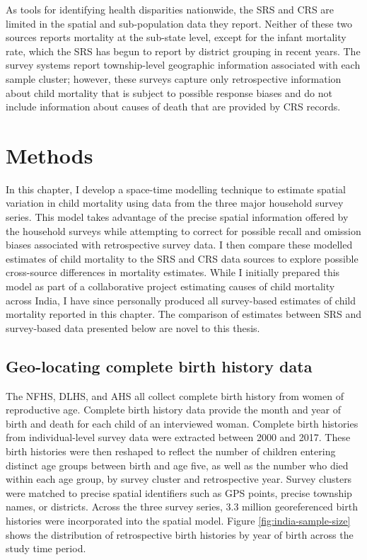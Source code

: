 \documentclass[
]{report}
\begin{document}
As tools for identifying health disparities nationwide, the SRS and CRS are limited in the spatial and sub-population data they report. Neither of these two sources reports mortality at the sub-state level, except for the infant mortality rate, which the SRS has begun to report by district grouping in recent years.\autocite{Mahapatra2010} The survey systems report township-level geographic information associated with each sample cluster; however, these surveys capture only retrospective information about child mortality that is subject to possible response biases and do not include information about causes of death that are provided by CRS records.\autocite{Dandona2016}

\hypertarget{methods-2}{%
\section{Methods}\label{methods-2}}

In this chapter, I develop a space-time modelling technique to estimate spatial variation in child mortality using data from the three major household survey series. This model takes advantage of the precise spatial information offered by the household surveys while attempting to correct for possible recall and omission biases associated with retrospective survey data. I then compare these modelled estimates of child mortality to the SRS and CRS data sources to explore possible cross-source differences in mortality estimates. While I initially prepared this model as part of a collaborative project estimating causes of child mortality across India,\autocite{Dandona2020} I have since personally produced all survey-based estimates of child mortality reported in this chapter. The comparison of estimates between SRS and survey-based data presented below are novel to this thesis.

\hypertarget{geo-locating-complete-birth-history-data}{%
\subsection{Geo-locating complete birth history data}\label{geo-locating-complete-birth-history-data}}

The NFHS, DLHS, and AHS all collect complete birth history from women of reproductive age. Complete birth history data provide the month and year of birth and death for each child of an interviewed woman. Complete birth histories from individual-level survey data were extracted between 2000 and 2017. These birth histories were then reshaped to reflect the number of children entering distinct age groups between birth and age five, as well as the number who died within each age group, by survey cluster and retrospective year.\autocite{Burstein2019,Ahmad2000} Survey clusters were matched to precise spatial identifiers such as GPS points, precise township names, or districts. Across the three survey series, 3.3 million georeferenced birth histories were incorporated into the spatial model. Figure \ref{fig:india-sample-size} shows the distribution of retrospective birth histories by year of birth across the study time period.
\end{document}
